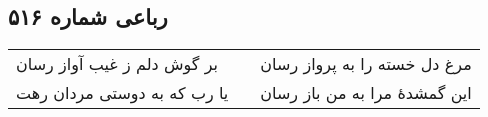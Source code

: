 \begin{center}
\section*{رباعی شماره ۵۱۶}
\label{sec:sh516}
\begin{longtable}{l p{0.5cm} r}
بر گوش دلم ز غیب آواز رسان
&&
مرغ دل خسته را به پرواز رسان
\\
یا رب که به دوستی مردان رهت
&&
این گمشدهٔ مرا به من باز رسان
\\
\end{longtable}
\end{center}
